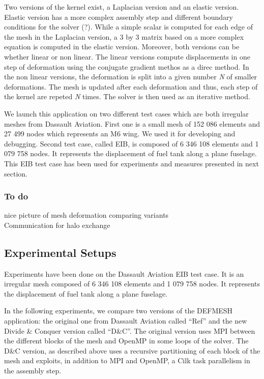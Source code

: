 \documentclass{IOS-Book-Article}
\begin{document}
Two versions of the kernel exist, a Laplacian version and an elastic version. Elastic version has a more complex assembly step and different boundary conditions for the solver (?).
While a simple scalar is computed for each edge of the mesh in the Laplacian version, a 3 by 3 matrix based on a more complex equation is computed in the elastic version.
Moreover, both versions can be whether linear or non linear.
The linear versions compute displacements in one step of deformation using the conjugate gradient methos as a direc method.
In the non linear versions, the deformation is split into a given number \emph{N} of smaller deformations.
The mesh is updated after each deformation and thus, each step of the kernel are repeted \emph{N} times. The solver is then used as an iterative method.

We launch this application on two different test cases which are both irregular meshes from Dassault Aviation.
First one is a small mesh of 152 086 elements and 27 499 nodes which represents an M6 wing. We used it for developing and debugging.
Second test case, called EIB, is composed of 6 346 108 elements and 1 079 758 nodes. It represents the displacement of fuel tank along a plane fuselage.
This EIB test case has been used for experiments and measures presented in next section.

\subsubsection{To do}
nice picture of mesh deformation comparing variants\\
Communication for halo exchange\\

\subsection{Experimental Setups}
Experiments have been done on the Dassault Aviation EIB test case. It is an irregular mesh composed of 6 346 108 elements and 1 079 758 nodes.
It represents the displacement of fuel tank along a plane fuselage.

In the following experiments, we compare two versions of the DEFMESH application: the original one from Dassault Aviation called “Ref” and the new
Divide \& Conquer version called “D\&C”. The original version uses MPI between the different blocks of the mesh and OpenMP in some loops of the solver.
The D\&C version, as described above uses a recursive partitioning of each block of the mesh and exploits, in addition to MPI and OpenMP, a Cilk task parallelism
in the assembly step.
\end{document}
